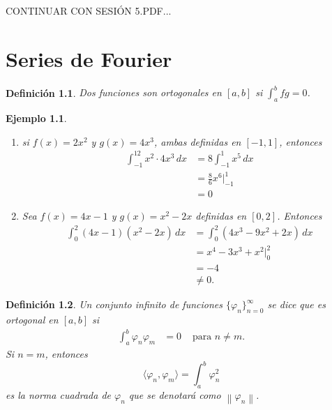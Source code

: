 \documentclass[11pt,letterpaper,draft]{report}
\newtheorem{defn}{Definición}
\newtheorem{example}{Ejemplo}[section]
\newcommand\norm[1]{\left\|#1\right\|}
\newcommand\<{\langle}
\renewcommand\>{\rangle}
\renewcommand\phi\varphi
\begin{document}
CONTINUAR CON SESIÓN 5.PDF...

\chapter{Series de Fourier}

\begin{defn}
  Dos funciones son ortogonales en $[a,b]$ si $\int_a^bfg=0$.
\end{defn}
\begin{example}
  \begin{enumerate}
    \item si $f(x)=2x^2$ y $g(x)=4x^3$, ambas definidas en
    $[-1,1]$, entonces
    \begin{align*}
      \int_{-1}^12x^2\cdot 4x^3\,dx
      &= 8\int_{-1}^1x^5\,dx \\
      &= \frac{8}{6}x^6|_{-1}^1 \\
      &= 0
    \end{align*}
    \item Sea $f(x)=4x-1$ y $g(x)=x^2-2x$ definidas en $[0,2]$.
    Entonces
    \begin{align*}
      \int_0^2(4x-1)(x^2-2x)\,dx
      &= \int_0^2(4x^3-9x^2+2x)\,dx \\
      &= x^4-3x^3+x^2 |_0^2 \\
      &= -4 \\
      &\neq 0.
    \end{align*}
  \end{enumerate}
\end{example}

\begin{defn}
  Un conjunto infinito de funciones $\{\phi_n\}_{n=0}^\infty$ se
  dice que es ortogonal en $[a,b]$ si
  \begin{align*}
    \int_a^b\phi_n\phi_m &= 0 & \text{ para } n\neq m.
  \end{align*}
  Si $n=m$, entonces
  \[
    \<\phi_n,\phi_m\> = \int_a^b \phi_n^2
  \]
  es la norma cuadrada de $\phi_n$ que se denotará como
  $\norm{\phi_n}$.
\end{defn}
\end{document}
